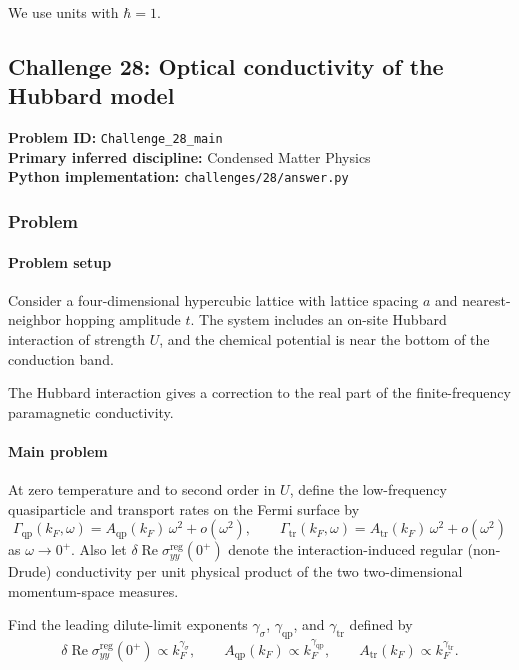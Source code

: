 {\color{blue}
We use units with \(\hbar=1\).
\subsection[Challenge 28: Optical conductivity of the Hubbard model]{Challenge 28: Optical conductivity of the Hubbard model}
\textbf{Problem ID:} \texttt{Challenge\_28\_main}\\
\textbf{Primary inferred discipline:} Condensed Matter Physics\\
\textbf{Python implementation:} \texttt{challenges/28/answer.py}

\subsubsection*{Problem}
\paragraph*{Problem setup}
Consider a four-dimensional hypercubic lattice with lattice spacing $a$ and nearest-neighbor hopping amplitude $t$. The system includes an on-site Hubbard interaction of strength $U$, and the chemical potential is near the bottom of the conduction band.

The Hubbard interaction gives a correction to the real part of the finite-frequency paramagnetic conductivity.

\paragraph*{Main problem}

{\color{blue}
At zero temperature and to second order in $U$, define the low-frequency quasiparticle and transport rates on the Fermi surface by
\[
\Gamma_{\mathrm{qp}}(k_F,\omega)
 =A_{\mathrm{qp}}(k_F)\,\omega^2+o(\omega^2),
\qquad
\Gamma_{\mathrm{tr}}(k_F,\omega)
 =A_{\mathrm{tr}}(k_F)\,\omega^2+o(\omega^2)
\]
as $\omega\to0^+$. Also let $\delta\operatorname{Re}\sigma^{\mathrm{reg}}_{yy}(0^+)$ denote the interaction-induced regular (non-Drude) conductivity per unit physical product of the two two-dimensional momentum-space measures.

Find the leading dilute-limit exponents $\gamma_\sigma$, $\gamma_{\mathrm{qp}}$, and $\gamma_{\mathrm{tr}}$ defined by
\[
\delta\operatorname{Re}\sigma^{\mathrm{reg}}_{yy}(0^+)\propto k_F^{\gamma_\sigma},
\qquad
A_{\mathrm{qp}}(k_F)\propto k_F^{\gamma_{\mathrm{qp}}},
\qquad
A_{\mathrm{tr}}(k_F)\propto k_F^{\gamma_{\mathrm{tr}}}.
\]
}
}
